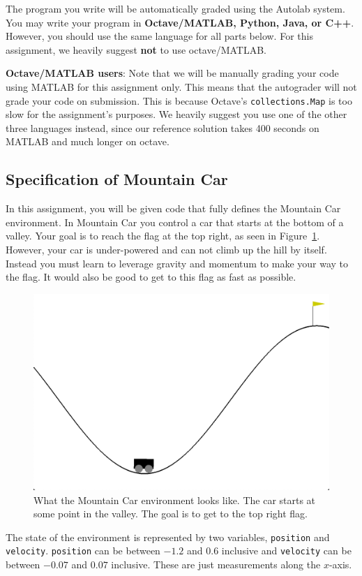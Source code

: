 \documentclass[11pt]{article}
\numberwithin{equation}{section} %
\numberwithin{figure}{section} %
\numberwithin{table}{section} %
\begin{document}
The program you write will be automatically graded using the Autolab system. You may write your program in \textbf{Octave/MATLAB, Python, Java, or C++}. However, you should use the same language for all parts below. For this assignment, we heavily suggest \textbf{not} to use octave/MATLAB.

\textbf{Octave/MATLAB users}: Note that we will be manually grading your code using MATLAB for this assignment only. This means that the autograder will not grade your code on submission. This is because Octave's \texttt{collections.Map} is too slow for the assignment's purposes. We heavily suggest you use one of the other three languages instead, since our reference solution takes 400 seconds on MATLAB and much longer on octave.

\subsection{Specification of Mountain Car}
In this assignment, you will be given code that fully defines the Mountain Car environment. In Mountain Car you control a car that starts at the bottom of a valley. Your goal is to reach the flag at the top right, as seen in Figure~\ref{fig:mountaincar}. However, your car is under-powered and can not climb up the hill by itself. Instead you must learn to leverage gravity and momentum to make your way to the flag. It would also be good to get to this flag as fast as possible.

\begin{figure}[H]
    \centering
    \includegraphics[width=0.5\linewidth]{figs/MountainCar.png}
    \caption{What the Mountain Car environment looks like. The car starts at some point in the valley. The goal is to get to the top right flag.}
    \label{fig:mountaincar}
\end{figure}

The state of the environment is represented by two variables, \texttt{position} and \texttt{velocity}. \texttt{position} can be between $-1.2$ and $0.6$ inclusive and \texttt{velocity} can be between $-0.07$ and $0.07$ inclusive. These are just measurements along the $x$-axis.
\end{document}

